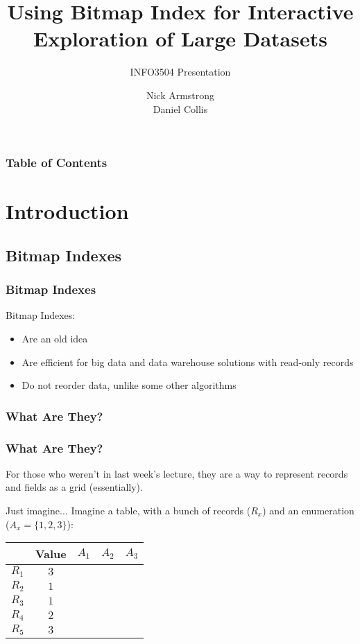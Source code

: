 \documentclass[11pt]{beamer}
\title[Bitmap Indexes for Large Datasets]{\textbf{Using Bitmap Index for Interactive Exploration of Large Datasets}}
\subtitle{INFO3504 Presentation}
\author{Nick Armstrong \\
        Daniel Collis}
\institute{University of Sydney}
\date{}
\begin{document}
\frame{\titlepage}

\begin{frame}
	\frametitle{Table of Contents}
	\tableofcontents
\end{frame}

\section{Introduction}

\subsection[Bitmap Indexes]{Bitmap Indexes}

\begin{frame}
	\frametitle{Bitmap Indexes}
	
	Bitmap Indexes:
	\begin{itemize}
		\pause
		\item Are an old idea
		\pause
		\item Are efficient for big data and data warehouse solutions with read-only records
		\pause
		\item Do not reorder data, unlike some other algorithms
	\end{itemize}
\end{frame}

\subsubsection[Bitmap Indexes]{What Are They?}
\begin{frame}
	\frametitle{What Are They?}
	
	For those who weren't in last week's lecture, they \pause are a way to represent records and fields as a grid (essentially).
	
	\pause
	\begin{exampleblock}{Just imagine...}
		Imagine a table, with a bunch of records ($R_x$) and an enumeration ($A_x = \{1, 2, 3\}$):
		
		\pause
		\begin{tabular}{r|c|c|c|c}
				& \textbf{Value} & $A_1$ & $A_2$ & $A_3$ \\ \hline
			$R_1$ & $3$	& 	& 	& \\
			$R_2$ & $1$	& 	& 	& \\
			$R_3$ & $1$	& 	& 	& \\
			$R_4$ & $2$	& 	& 	& \\
			$R_5$ & $3$	& 	& 	& 
		\end{tabular}
	\end{exampleblock}
\end{frame}
\end{document}
